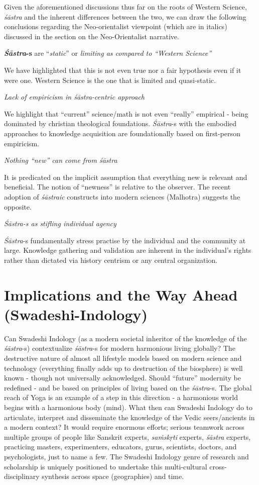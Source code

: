 Given the aforementioned discussions thus far on the roots of Western Science, \textit{śāstra} and the inherent differences between the two, we can draw the following conclusions regarding the Neo-orientalist viewpoint (which are in italics) discussed in the section on the Neo-Orientalist narrative.

\textbf{\textit{Śāstra}-s} are “\textit{static}” or \textit{limiting as compared to “Western Science”}

We have highlighted that this is not even true nor a fair hypothesis even if it were one. Western Science is the one that is limited and quasi-static.

\textit{Lack of empiricism in śāstra-centric approach}

We highlight that “current” science/math is not even “really” empirical - being dominated by christian theological foundations. \textit{Śāstra}-s with the embodied approaches to knowledge acquisition are foundationally based on first-person empiricism.

\textit{Nothing “new” can come from śāstra}

It is predicated on the implicit assumption that everything new is relevant and beneficial. The notion of “newness” is relative to the observer. The recent adoption of \textit{śāstraic} constructs into modern sciences (Malhotra) suggests the opposite.

\textit{Śāstra-s as stifling individual agency}

\textit{Śāstra}-s fundamentally stress practise by the individual and the community at large. Knowledge gathering and validation are inherent in the individual's rights rather than dictated via history centrism or any central organization.


\section*{Implications and the Way Ahead (Swadeshi-Indology)}

Can Swadeshi Indology (as a modern societal inheritor of the knowledge of the \textit{śāstra}-s) contextualize \textit{śāstra}-s for modern harmonious living globally? The destructive nature of almost all lifestyle models based on modern science and technology (everything finally adds up to destruction of the biosphere) is well known - though not universally acknowledged. Should “future” modernity be redefined - and be based on principles of living based on the \textit{śāstra}-s. The global reach of Yoga is an example of a step in this direction - a harmonious world begins with a harmonious body (mind). What then can Swadeshi Indology do to articulate, interpret and disseminate the knowledge of the Vedic seers/ancients in a modern context? It would require enormous efforts; serious teamwork across multiple groups of people like Sanskrit experts, \textit{saṁskṛti} experts, \textit{śāstra} experts, practicing masters, experimenters, educators, gurus, scientists, doctors, and psychologists, just to name a few. The Swadeshi Indology genre of research and scholarship is uniquely positioned to undertake this multi-cultural cross-disciplinary synthesis across space (geographies) and time.

